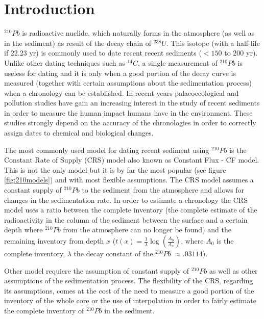 \documentclass [10pt] {article}
\begin{document}
\section{Introduction}

$^{210}Pb$ is radioactive nuclide, which naturally forms in the atmosphere (as well as in the sediment) as result of the decay chain of $^{238}U$. 
This isotope (with a half-life if 22.23 yr) is commonly used to date recent recent sediments ($<150$ to $200$ yr). 
Unlike other dating techniques such as $^{14}C$, a single measurement of $^{210}Pb$ is useless for dating and it is only when a good portion of the decay curve is measured (together with certain assumptions about the sedimentation process) when a chronology can be established.  
In recent years palaeoecological and pollution studies have gain an increasing interest in the study of recent sediments in order to measure the human impact humans have in the environment.
These studies strongly depend on the accuracy of the chronologies in order to correctly assign dates to chemical and biological changes.

The most commonly used model for dating recent sediment using $^{210}Pb$ is the Constant Rate of Supply (CRS) model \citep{Appleby1978,Robbins1978,Sanchez-Cabeza2012} also known as Constant Flux - CF model. 
This is not the only model but it is by far the most popular (see figure \ref{fig:210models}) and with most flexible assumptions. 
The CRS model assumes a constant supply of $^{210}Pb$ to the sediment from the atmosphere and allows for changes in the sedimentation rate. 
In order to estimate a chronology the CRS model uses a ratio between the complete inventory (the complete estimate of the radioactivity in the column of the sediment between the surface and a certain depth where $^{210}Pb$ from the atmosphere can no longer be found) and the remaining  inventory from depth $x$ ($t(x)=\frac{1}{\lambda}\log\left( \frac{A_0}{A_x}\right)$, where $A_0$ is the complete inventory, $\lambda$ the decay constant of the $^{210}Pb$ $\approx .03114$).

Other model requiere the assumption of constant supply of $^{210}Pb$ as well as other assumptions of the sedimentation process. 
The flexibility of the CRS, regarding its assumptions, comes at the cost of the need to measure a good portion of the inventory of the whole core or the use of interpolation in order to fairly estimate the complete inventory of $^{210}Pb$ in the sediment. 
\end{document}
